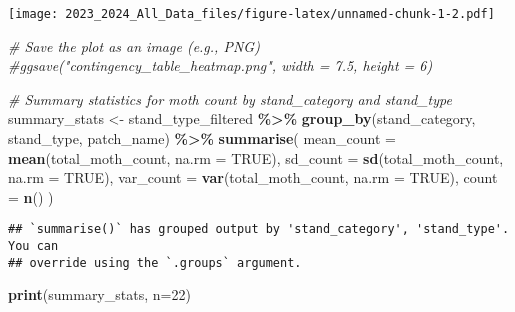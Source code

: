 \documentclass[
]{article}
\newenvironment{Shaded}{\begin{snugshade}}{\end{snugshade}}
\newcommand{\AttributeTok}[1]{\textcolor[rgb]{0.13,0.29,0.53}{#1}}
\newcommand{\CommentTok}[1]{\textcolor[rgb]{0.56,0.35,0.01}{\textit{#1}}}
\newcommand{\ConstantTok}[1]{\textcolor[rgb]{0.56,0.35,0.01}{#1}}
\newcommand{\DecValTok}[1]{\textcolor[rgb]{0.00,0.00,0.81}{#1}}
\newcommand{\FunctionTok}[1]{\textcolor[rgb]{0.13,0.29,0.53}{\textbf{#1}}}
\newcommand{\NormalTok}[1]{#1}
\newcommand{\OtherTok}[1]{\textcolor[rgb]{0.56,0.35,0.01}{#1}}
\newcommand{\SpecialCharTok}[1]{\textcolor[rgb]{0.81,0.36,0.00}{\textbf{#1}}}
\begin{document}
\texttt{[image: 2023\_2024\_All\_Data\_files/figure-latex/unnamed-chunk-1-2.pdf]}

\begin{Shaded}
\begin{Highlighting}[]
\CommentTok{\# Save the plot as an image (e.g., PNG)}
\CommentTok{\#ggsave("contingency\_table\_heatmap.png", width = 7.5, height = 6)}


\CommentTok{\# Summary statistics for moth count by stand\_category and stand\_type}
\NormalTok{summary\_stats }\OtherTok{\textless{}{-}}\NormalTok{ stand\_type\_filtered }\SpecialCharTok{\%\textgreater{}\%}
  \FunctionTok{group\_by}\NormalTok{(stand\_category, stand\_type, patch\_name) }\SpecialCharTok{\%\textgreater{}\%}
  \FunctionTok{summarise}\NormalTok{(}
    \AttributeTok{mean\_count =} \FunctionTok{mean}\NormalTok{(total\_moth\_count, }\AttributeTok{na.rm =} \ConstantTok{TRUE}\NormalTok{),}
    \AttributeTok{sd\_count =} \FunctionTok{sd}\NormalTok{(total\_moth\_count, }\AttributeTok{na.rm =} \ConstantTok{TRUE}\NormalTok{),}
    \AttributeTok{var\_count =} \FunctionTok{var}\NormalTok{(total\_moth\_count, }\AttributeTok{na.rm =} \ConstantTok{TRUE}\NormalTok{),}
    \AttributeTok{count =} \FunctionTok{n}\NormalTok{()}
\NormalTok{  )}
\end{Highlighting}
\end{Shaded}

\begin{verbatim}
## `summarise()` has grouped output by 'stand_category', 'stand_type'. You can
## override using the `.groups` argument.
\end{verbatim}

\begin{Shaded}
\begin{Highlighting}[]
\FunctionTok{print}\NormalTok{(summary\_stats, }\AttributeTok{n=}\DecValTok{22}\NormalTok{)}
\end{Highlighting}
\end{Shaded}
\end{document}
